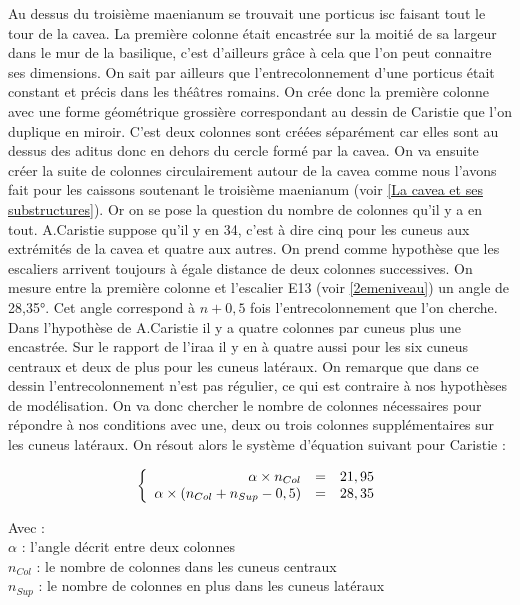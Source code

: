 Au dessus du troisième maenianum se trouvait une \gls{porticus isc} faisant tout le tour de la cavea. La première colonne était encastrée sur la moitié de sa largeur dans le mur de la basilique, c'est d'ailleurs grâce à cela que l'on peut connaitre ses dimensions. On sait par ailleurs que l'entrecolonnement d'une porticus était constant et précis dans les théâtres romains. On crée donc la première colonne avec une forme géométrique grossière correspondant au dessin de Caristie que l'on duplique en miroir. C'est deux colonnes sont créées séparément car elles sont au dessus des aditus donc en dehors du cercle formé par la cavea. On va ensuite créer la suite de colonnes circulairement autour de la cavea comme nous l'avons fait pour les caissons soutenant le troisième maenianum (voir \ref{La cavea et ses substructures}). Or on se pose la question du nombre de colonnes qu'il y a en tout. A.Caristie suppose qu'il y en 34, c'est à dire cinq pour les \gls{cuneus} aux extrémités de la cavea et quatre aux autres. On prend comme hypothèse que les escaliers arrivent toujours à égale distance de deux colonnes successives. On mesure entre la première colonne et l'escalier E13 (voir \ref{2emeniveau}) un angle de 28,35°. Cet angle correspond à $n+0,5$ fois l'entrecolonnement que l'on cherche. Dans l'hypothèse de A.Caristie il y a quatre colonnes par cuneus plus une encastrée. Sur le rapport de l'\gls{iraa} \cite[Pl. XX]{orangePl} il y en à quatre aussi pour les six cuneus centraux et deux de plus pour les cuneus latéraux. On remarque que dans ce dessin l'entrecolonnement n'est pas régulier, ce qui est contraire à nos hypothèses de modélisation. On va donc chercher le nombre de colonnes nécessaires pour répondre à nos conditions avec une, deux ou trois colonnes supplémentaires sur les cuneus latéraux. On résout alors le système d'équation suivant pour Caristie :


\begin{equation}
  \left \{
   \begin{array}{r c l}
      \alpha \times n_{Col}  & = & 21,95 \\
      \alpha \times (n_{Col} + n_{Sup} - 0,5)   & = &  28,35
   \end{array}
   \right .
\end{equation}

Avec : \\
$\alpha$ : l'angle décrit entre deux colonnes \\
$n_{Col}$ : le nombre de colonnes dans les cuneus centraux \\
$n_{Sup}$ : le nombre de colonnes en plus dans les cuneus latéraux \\

